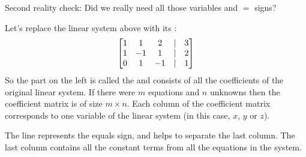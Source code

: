 
Second reality check:  Did we really need all those variables and $=$ signs?

Let's replace the linear system above with its :
$$
\left[ \begin{matrix} 1 & 1 & 2 & | & 3\\
1 & -1 & 1 & | & 2\\
0 & 1 & -1 & | & 1 \end{matrix} \right]
$$
So the part on the left is called the  and
consists of all the coefficients of the original linear system.
If there were $m$ equations and $n$ unknowns then the coefficient
matrix is of size $m\times n$.  Each column of the coefficient matrix
corresponds to one variable of the linear system (in this case, $x$,
$y$ or $z$).

The line represents the
equals sign, and helps to separate the last column.  The last column  contains all the constant
terms from all the equations in the system.

